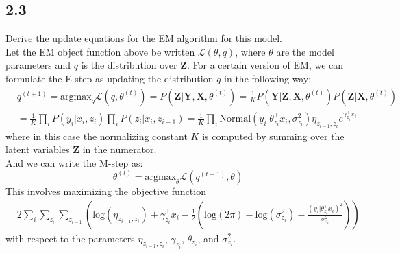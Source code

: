 \documentclass[12pt]{article}
\begin{document}

\subsection*{2.3}
Derive the update equations for the EM algorithm for this model.
\\

Let the EM object function above be written $\mathcal{L}(\theta,q)$, where $\theta$ are the model parameters and $q$ is the distribution over $\textbf{Z}$. For a certain version of EM, we can formulate the E-step as updating the distribution $q$ in the following way: 
\begin{equation}
    \begin{split}
        & q^{(t+1)} = \text{argmax}_q \mathcal{L}(q,\theta^{(t)}) = P(\textbf{Z} | \textbf{Y}, \textbf{X}, \theta^{(t)})
            = \frac{1}{K} P(\textbf{Y} | \textbf{Z}, \textbf{X}, \theta^{(t)}) P(\textbf{Z} | \textbf{X}, \theta^{(t)}) \\
        & = \frac{1}{K} \prod_i P(y_i | x_i, z_i) \prod_i P(z_i | x_i, z_{i-1})
            = \frac{1}{K} \prod_i \text{Normal}(y_i | \theta_{z_i}^{\top} x_i, \sigma_{z_i}^2)  
            \eta_{z_{i-1},z_i} e^{\gamma_{z_i}^{\top} x_i}
    \end{split}
\end{equation}
where in this case the normalizing constant $K$ is computed by summing over the latent variables $\textbf{Z}$ in the numerator.
\\

And we can write the M-step as:
\begin{equation}
    \theta^{(t)} = \text{argmax}_{\theta} \mathcal{L}(q^{(t+1)},\theta)
\end{equation}
This involves maximizing the objective function 
\begin{equation}
    \begin{split}
        & 2\sum_i \sum_{z_i} \sum_{z_{i-1}} \left( \text{log}(\eta_{z_{i-1},z_i}) + \gamma_{z_i}^{\top} x_i 
             -\frac{1}{2}\left( \text{log}(2\pi) - \text{log}(\sigma_{z_i}^2) - \frac{(y_i | \theta_{z_i}^{\top} x_i)^2}{ \sigma_{z_i}^2} \right)  \right)
    \end{split}
\end{equation}
with respect to the parameters $\eta_{z_{i-1},z_i}$, $\gamma_{z_i}$, $\theta_{z_i}$, and $\sigma_{z_i}^2$.
\end{document}
